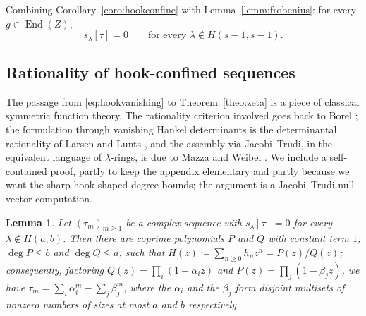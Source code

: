 \documentclass[11pt]{article}
\newtheorem{lemm}[theo]{Lemma}
\newcommand{\End}{\operatorname{End}}
\newcommand{\hook}[2]{H(#1,#2)}                   %
\begin{document}
Combining Corollary~\ref{coro:hookconfine} with
Lemma~\ref{lemm:frobenius}: for every $g\in\End(Z)$,
\begin{equation}\label{eq:hookvanishing}
s_{\lambda}[\tau]=0
\qquad\text{for every }\lambda\notin \hook{s-1}{s-1}.
\end{equation}

\subsection{Rationality of hook-confined
sequences}\label{subsec:rationality}

The passage from \eqref{eq:hookvanishing} to
Theorem~\ref{theo:zeta} is a piece of classical symmetric function
theory. The rationality criterion involved goes back to Borel
\cite{Bor1894}; the formulation through
vanishing Hankel determinants is the determinantal rationality
of Larsen and Lunts \cite[\S2]{LL04}, and the assembly via
Jacobi--Trudi, in the equivalent language of $\lambda$-rings, is
due to Mazza and Weibel \cite[Prop.~4.14, Cor.~4.15]{MW13}. We
include a self-contained proof, partly to keep the appendix
elementary and partly because we want the sharp hook-shaped degree
bounds; the argument is a Jacobi--Trudi null-vector computation.

\begin{lemm}\label{lemm:sfrationality}
Let $(\tau_{m})_{m\ge1}$ be a complex sequence with
$s_{\lambda}[\tau]=0$ for every $\lambda\notin\hook{a}{b}$. Then
there are coprime polynomials $P$ and $Q$ with constant term $1$,
$\deg P\le b$ and $\deg Q\le a$, such that
$H(z)\coloneqq\sum_{n\ge0}h_{n}z^{n}=P(z)/Q(z)$; consequently,
factoring $Q(z)=\prod_{i}(1-\alpha_{i}z)$ and
$P(z)=\prod_{j}(1-\beta_{j}z)$, we have
$\tau_{m}=\sum_{i}\alpha_{i}^{m}-\sum_{j}\beta_{j}^{m}$, where
the $\alpha_{i}$ and the $\beta_{j}$ form disjoint multisets of
nonzero numbers of sizes at most $a$ and $b$ respectively.
\end{lemm}
\end{document}
